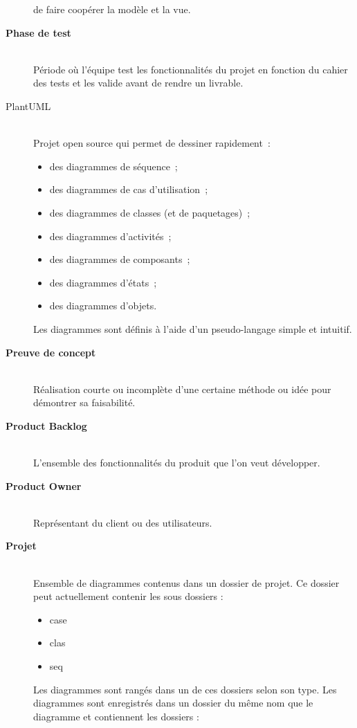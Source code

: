 \documentclass[hidelinks, 10pt,a4paper]{article}
\begin{document}
\begin{description}
			de faire coopérer la modèle et la vue.
\item[\textbf{Phase de test}]~\\ Période où l'équipe test les fonctionnalités du projet en fonction du cahier des tests et les valide avant de rendre un livrable.
  \item[PlantUML]~\\ Projet open source qui permet de dessiner rapidement~:
    \begin{itemize}
      \item des diagrammes de séquence~;
      \item des diagrammes de cas d’utilisation~;
      \item des diagrammes de classes (et de paquetages)~;
      \item des diagrammes d’activités~;
      \item des diagrammes de composants~;
      \item des diagrammes d’états~;
      \item des diagrammes d’objets.
    \end{itemize}
    Les diagrammes sont définis à l’aide d’un pseudo-langage simple et intuitif. %
    \item[\textbf{Preuve de concept}]~\\ Réalisation courte ou incomplète d'une certaine méthode ou idée pour démontrer sa faisabilité.
    \item[\textbf{Product Backlog}]~\\ L'ensemble des fonctionnalités du produit que l'on veut développer.
    \item[\textbf{Product Owner}]~\\  Représentant du client ou des utilisateurs.
     \item[\textbf{Projet}]~\\ Ensemble de diagrammes contenus dans un dossier de projet. Ce dossier peut actuellement contenir les sous dossiers : 
	\begin{itemize}
	  \item case
	  \item clas
	  \item seq
	\end{itemize}
	Les diagrammes sont rangés dans un de ces dossiers selon son type. Les diagrammes sont 
	enregistrés dans un dossier du même nom que le diagramme et contiennent les dossiers :
	\begin{itemize}

\end{itemize}
\end{description}
\end{document}
